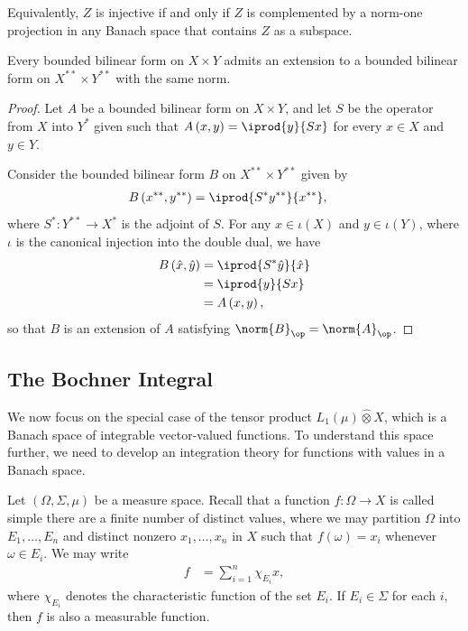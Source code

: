 \documentclass[10pt]{mypackage}
\begin{document}
Equivalently, $Z$ is injective if and only if $Z$ is complemented by a norm-one projection in any Banach space that contains $Z$ as a subspace.
\begin{theorem}
  Every bounded bilinear form on $X\times Y$ admits an extension to a bounded bilinear form on $X^{\ast\ast}\times Y^{\ast\ast}$ with the same norm.
\end{theorem}
\begin{proof}
  Let $A$ be a bounded bilinear form on $X\times Y$, and let $S$ be the operator from $X$ into $Y^{\ast}$ given such that $A\left( x,y \right) = \iprod{y}{Sx}$ for every $x\in X$ and $y\in Y$.

  Consider the bounded bilinear form $B$ on $X^{\ast\ast}\times Y^{\ast\ast}$ given by
  \begin{align*}
    B\left( x^{\ast\ast},y^{\ast\ast} \right) &= \iprod{S^{\ast}y^{\ast\ast}}{x^{\ast\ast}},
  \end{align*}
  where $S^{\ast}\colon Y^{\ast\ast}\rightarrow X^{\ast}$ is the adjoint of $S$. For any $x\in \iota(X)$ and $y\in \iota(Y)$, where $\iota$ is the canonical injection into the double dual, we have
  \begin{align*}
    B\left( \hat{x},\hat{y} \right) &= \iprod{S^{\ast}\hat{y}}{\hat{x}}\\
                                    &= \iprod{y}{Sx}\\
                                    &= A\left( x,y \right),
  \end{align*}
  so that $B$ is an extension of $A$ satisfying $\norm{B}_{\op} = \norm{A}_{\op}$.
\end{proof}
\subsection{The Bochner Integral}%
We now focus on the special case of the tensor product $L_1\left( \mu \right)\hat\otimes X$, which is a Banach space of integrable vector-valued functions. To understand this space further, we need to develop an integration theory for functions with values in a Banach space.

Let $\left( \Omega,\Sigma,\mu \right)$ be a measure space. Recall that a function $f\colon \Omega\rightarrow X$ is called simple there are a finite number of distinct values, where we may partition $\Omega$ into $E_1,\dots,E_n$ and distinct nonzero $x_1,\dots,x_n$ in $X$ such that $f(\omega) = x_i$ whenever $\omega\in E_i$. We may write
\begin{align*}
  f &= \sum_{i=1}^{n}\chi_{E_i}x,
\end{align*}
where $\chi_{E_i}$ denotes the characteristic function of the set $E_i$. If $E_i\in \Sigma$ for each $i$, then $f$ is also a measurable function.
\end{document}
